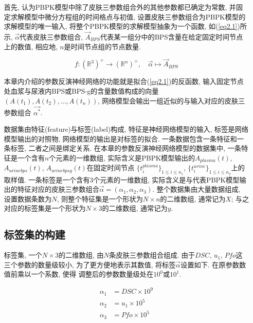 \documentclass[a4paper,punct=banjiao,twoside]{ctexrep}
\theoremstyle{plain}
\theoremstyle{definition}
\theoremstyle{remark}
\begin{document}
首先, 认为PBPK模型中除了皮肤三参数组合外的其他参数都已确定为常数, 并固定求解模型中微分方程组的时间格点与初值, 设置皮肤三参数组合为PBPK模型的求解模型的唯一输入, 
将整个PBPK模型的求解模型抽象为一个函数, 如(\ref{eq2.1})所示,  $\vec{\alpha}$代表皮肤三参数组合, $\vec{A}_{BPS}$代表某一组分中的BPS含量在给定固定时间节点上的数值, 相应地, $n$是时间节点组的节点数量.

\begin{equation}\label{eq2.1}
f:(\mathbb{R}^3)^{+} \to (\mathbb{R}^n)^{+},\quad \vec{\alpha}\mapsto \vec{A}_{BPS}
\end{equation}

\noindent 本章内介绍的参数反演神经网络的功能就是拟合(\ref{eq2.1})的反函数, 输入固定节点处血浆与尿液内BPS或BPS-g的含量数值构成的向量$(A(t_1),A(t_2),\dots,A(t_n))$, 网络模型会输出一组近似的与输入对应的皮肤三参数组合
$\vec{\alpha^*}$.

数据集由特征(feature)与标签(label)构成, 特征是神经网络模型的输入, 标签是网络模型输出的对照物, 网络模型的输出是对标签的拟合. 一条数据包含一条特征和一条标签, 二者之间是绑定关系. 
在本章的参数反演神经网络模型的数据集中, 一条特征是一个含有$n$个元素的一维数组, 实际含义是PBPK模型输出的$A_{plasma}(t)$, $A_{urinebps}(t)$, $A_{urinebpsg}(t)$在固定时间节点
$\{t^{plasma}_{i}\}_{1 \leq i \leq n_1}$, $\{t^{urine}_{i}\}_{1 \leq i \leq n_2}$上的取样值. 一条标签是一个含有$3$个元素的一维数组, 实际含义是与代表PBPK模型输出的特征对应的皮肤三参数组合$\vec{\alpha} = (\alpha_1,\alpha_2,\alpha_3)$. 
整个数据集由大量数据组成, 设置数据条数为$N$, 则整个特征集是一个形状为$N \times n$的二维数组, 通常记为$X$; 与之对应的标签集是一个形状为$N \times 3$的二维数组, 通常记为$y$. 

\subsection{标签集的构建}

标签集, 一个$N \times 3$的二维数组, 由$N$条皮肤三参数组合组成. 由于$DSC$, $u_1$, $Pfo$这三个参数的数量级较小, 为了更方便地表示其数值, 将标签$\vec{\alpha}$设置如下. 在原参数数值前乘以一个系数, 使得
调整后的参数数量级处在$10^0$或$10^1$.

\begin{align*}
  \alpha_1 &= DSC \times 10^9 \\
  \alpha_2 &=u_1 \times 10^5\\
  \alpha_3 &= Pfo \times 10^5\\
\end{align*}
\end{document}
